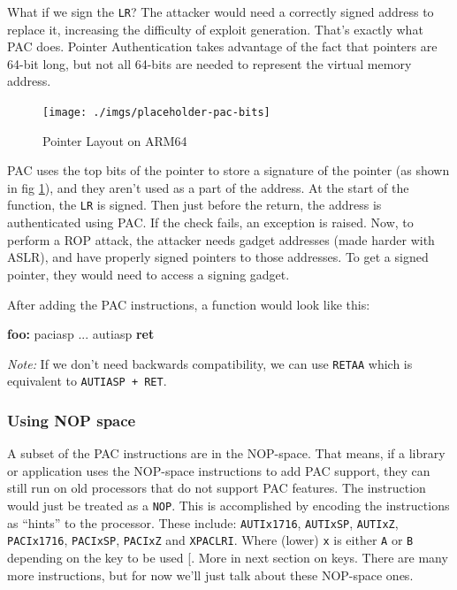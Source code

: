 \documentclass[a4paper, nobind]{templates/ociamthesis}
\newenvironment{Shaded}{\begin{snugshade}}{\end{snugshade}}
\newcommand{\ControlFlowTok}[1]{\textcolor[rgb]{0.13,0.29,0.53}{\textbf{#1}}}
\newcommand{\FunctionTok}[1]{\textcolor[rgb]{0.13,0.29,0.53}{\textbf{#1}}}
\newcommand{\NormalTok}[1]{#1}
\renewenvironment{Shaded}
{
  \vspace{10pt}%
  \begin{snugshade}%
}{%
  \end{snugshade}%
  \vspace{8pt}%
}
\begin{document}
What if we sign the \texttt{LR}? The attacker would need a correctly signed address to replace it,
increasing the difficulty of exploit generation.
That's exactly what PAC does. Pointer Authentication
takes advantage of the fact that pointers are 64-bit long, but not all 64-bits
are needed to represent the virtual memory address.

\begin{figure}

{\centering \texttt{[image: ./imgs/placeholder-pac-bits]} 

}

\caption{Pointer Layout on ARM64}\label{fig:pac-bits}
\end{figure}

PAC uses the top bits of the pointer to store a signature of the pointer
(as shown in fig \ref{fig:pac-bits}), and they aren't
used as a part of the address. At the start of the function, the \texttt{LR} is signed.
Then just before the return, the address is authenticated using PAC. If the check fails,
an exception is raised. Now, to perform a ROP attack, the attacker needs gadget addresses
(made harder with ASLR), and have properly signed pointers to those addresses.
To get a signed pointer, they would need to access a signing gadget.

After adding the PAC instructions, a function would look like this:

\begin{Shaded}
\begin{Highlighting}[]
\FunctionTok{foo:}
\NormalTok{  paciasp}
\NormalTok{  ...}
\NormalTok{  autiasp}
  \ControlFlowTok{ret}
\end{Highlighting}
\end{Shaded}

\emph{Note:} If we don't need backwards compatibility, we can use \texttt{RETAA} which is equivalent to \texttt{AUTIASP\ +\ RET}.

\subsubsection{Using NOP space}\label{using-nop-space}

A subset of the PAC instructions are in the NOP-space. That means, if a
library or application uses the NOP-space instructions to add PAC support,
they can still run on old processors that do not support PAC features.
The instruction would just be treated as a \texttt{NOP}.
This is accomplished by encoding the instructions as ``hints'' to the processor.
These include: \texttt{AUTIx1716}, \texttt{AUTIxSP}, \texttt{AUTIxZ}, \texttt{PACIx1716}, \texttt{PACIxSP}, \texttt{PACIxZ} and \texttt{XPACLRI}.
Where (lower) \texttt{x} is either \texttt{A} or \texttt{B} depending on the key to be used {[}\citeproc{ref-sipearl}{52}{]}.
More in next section on keys. There are many more instructions,
but for now we'll just talk about these NOP-space ones.
\end{document}
